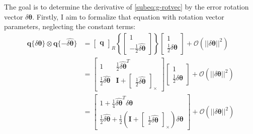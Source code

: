 The goal is to determine the derivative of \eqref{subeq:g-rotvec} by the error rotation vector $\delta\boldsymbol{\theta}$. Firstly, I aim to formalize that equation with rotation vector parameters, neglecting the constant terms:
\begin{equation}
\begin{aligned}
    \mathbf{q}\{\delta\boldsymbol{\theta}\} \otimes \mathbf{q}\{-\hat{\delta\boldsymbol{\theta}}\} &=  \begin{bmatrix} \mathbf{q}\end{bmatrix}_R\left\{\begin{bmatrix}
        1 \\ -\frac{1}{2}\hat{\delta\boldsymbol{\theta}}
    \end{bmatrix}\right\} 
    \begin{bmatrix} 1 \\ \frac{1}{2}\delta\boldsymbol{\theta} \end{bmatrix} + \mathcal{O}(||\delta\boldsymbol{\theta}||^2) \\
    &=
    \begin{bmatrix}
        1 & \frac{1}{2}\hat{\delta\boldsymbol{\theta}}^T \\
        \frac{1}{2}\hat{\delta\boldsymbol{\theta}} & \mathbf{I}+\begin{bmatrix}
            \frac{1}{2}\hat{\delta\boldsymbol{\theta}}
        \end{bmatrix}_\times 
    \end{bmatrix}  \begin{bmatrix} 1 \\ \frac{1}{2}\delta\boldsymbol{\theta} \end{bmatrix}+\mathcal{O}(||\delta\boldsymbol{\theta}||^2)  \\ &=
    \begin{bmatrix}
        1+\frac{1}{4}\hat{\delta\boldsymbol{\theta}}^T\delta\boldsymbol{\theta} \\
        \frac{1}{2}\hat{\delta\boldsymbol{\theta}}+\frac{1}{2}\left(\mathbf{I}+\begin{bmatrix}
            \frac{1}{2}\hat{\delta\boldsymbol{\theta}}
        \end{bmatrix}_\times\right)\delta\boldsymbol{\theta}
    \end{bmatrix}+\mathcal{O}(||\delta\boldsymbol{\theta}||^2) 
\end{aligned}
\end{equation}

